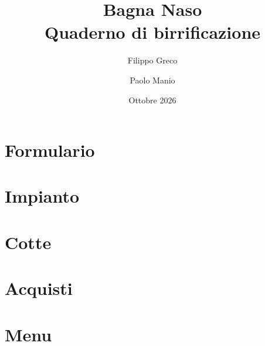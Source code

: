 \documentclass[11pt,a4paper]{article}
\title{Bagna Naso \\ \large Quaderno di birrificazione}
\author{Filippo Greco \and Paolo Manio}
\date{Ottobre 2026}
\begin{document}
\maketitle
\tableofcontents

\clearpage
\part{Formulario}


\clearpage
\part{Impianto}


\clearpage
\part{Cotte}


\clearpage


\clearpage


\clearpage
\part{Acquisti}


\clearpage
\part{Menu}

\end{document}
